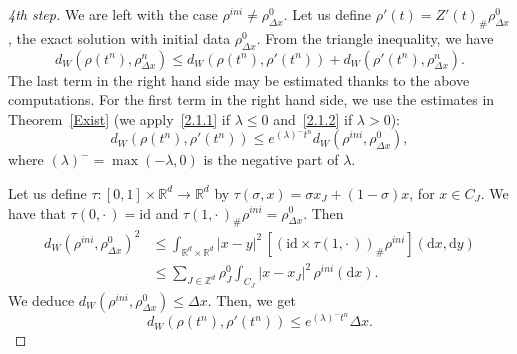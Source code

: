 \documentclass[11pt]{article}
\theoremstyle{definition}
\numberwithin{equation}{section}
\newcommand*{\dd}{\mathrm{d}}
\newcommand*{\dx}{\dd x}
\newcommand*{\dy}{\dd y}
\newcommand*\RR{\mathbb{R}}
\newcommand*\ZZ{\mathbb{Z}}
\newenvironment{step}[1]{\begin{proof}[#1]}{\let\qed\relax \end{proof}}
\begin{document}
\begin{step}{4th step}%
We are left with the case $\rho^{ini}\neq \rho_{\Delta x}^0$. Let us define $\rho'(t)=Z'(t)_\#\rho_{\Delta x}^0$, the exact solution with initial data $\rho_{\Delta x}^0$. From the triangle inequality, we have
\[
d_W(\rho(t^n),\rho_{\Delta x}^n) \leq d_W(\rho(t^n),\rho'(t^n)) + d_W(\rho'(t^n),\rho_{\Delta x}^n).
\]
The last term in the right hand side may be estimated thanks to the above computations. For the first term in the right hand side, we use the estimates in Theorem~\ref{Exist} (we apply~\eqref{2.1.1} if $\lambda \leq 0$ and~\eqref{2.1.2} if $\lambda >0$):
\[
d_W(\rho(t^n),\rho'(t^n)) \leq e^{(\lambda)^{-} t^n} d_W(\rho^{ini},\rho_{\Delta x}^0),
\]
where $(\lambda)^{-}=\max(-\lambda,0)$ is the negative part of $\lambda$.

Let us define $\tau:[0,1]\times \RR^d \to \RR^d$ by $\tau(\sigma,x) = \sigma x_J + (1-\sigma)x$, for $x \in C_J$. We have that $\tau(0,{\cdot\,})=\mathrm{id}$ and $\tau(1,{\cdot\,})_\# \rho^{ini} = \rho_{\Delta x}^0$. Then
\begin{equation}\label{eq:wp:condition:initiale}
\begin{split}
d_W(\rho^{ini},\rho_{\Delta x}^0)^2 &\leq 
\int_{\RR^d\times \RR^d} |x-y|^2 \, [(\mathrm{id}\times\tau(1,{\cdot\,}))_\# \rho^{ini}](\dx,\dy)
\\
& \leq  \sum_{J\in \ZZ^d} \rho_J^0 \int_{C_J} |x-x_J|^2 \,\rho^{ini}(\dx).
\end{split}
\end{equation}
We deduce $d_W(\rho^{ini},\rho_{\Delta x}^0) \leq \Delta x$. Then, we get
\[
d_W(\rho(t^n),\rho'(t^n)) \leq e^{(\lambda)^- t^n} \Delta x.
\]
\end{step}
\end{document}
